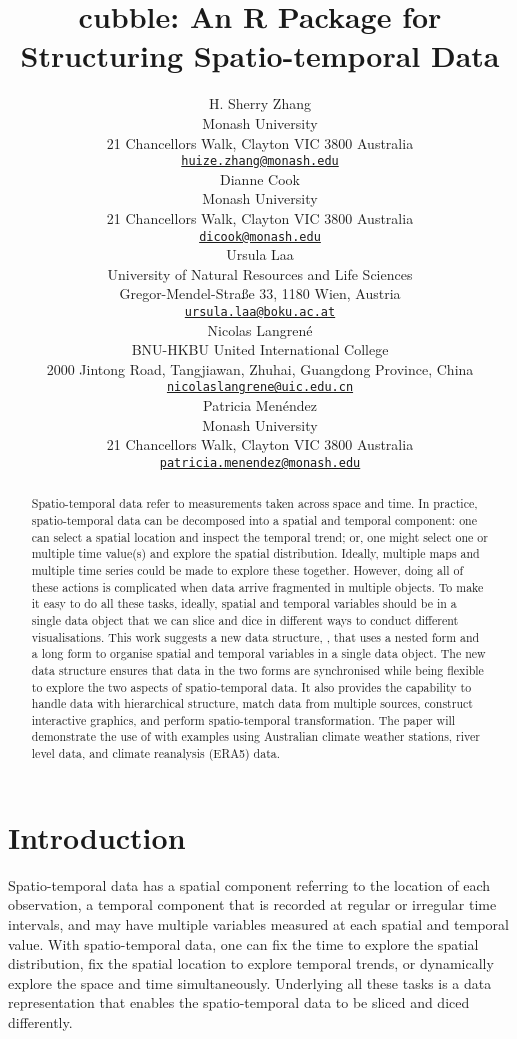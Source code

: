 \documentclass{article}
\title{cubble: An R Package for Structuring Spatio-temporal Data}
\author{
    H. Sherry Zhang
   \\
    Monash University \\
  21 Chancellors Walk, Clayton VIC 3800 Australia \\
  \texttt{\href{mailto:huize.zhang@monash.edu}{\nolinkurl{huize.zhang@monash.edu}}} \\
   \And
    Dianne Cook
   \\
    Monash University \\
  21 Chancellors Walk, Clayton VIC 3800 Australia \\
  \texttt{\href{mailto:dicook@monash.edu}{\nolinkurl{dicook@monash.edu}}} \\
   \And
    Ursula Laa
   \\
    University of Natural Resources and Life Sciences \\
  Gregor-Mendel-Straße 33, 1180 Wien, Austria \\
  \texttt{\href{mailto:ursula.laa@boku.ac.at}{\nolinkurl{ursula.laa@boku.ac.at}}} \\
   \And
    Nicolas Langrené
   \\
    BNU-HKBU United International College \\
  2000 Jintong Road, Tangjiawan, Zhuhai, Guangdong Province, China \\
  \texttt{\href{mailto:nicolaslangrene@uic.edu.cn}{\nolinkurl{nicolaslangrene@uic.edu.cn}}} \\
   \And
    Patricia Menéndez
   \\
    Monash University \\
  21 Chancellors Walk, Clayton VIC 3800 Australia \\
  \texttt{\href{mailto:patricia.menendez@monash.edu}{\nolinkurl{patricia.menendez@monash.edu}}} \\
  }
\begin{document}
\maketitle


\begin{abstract}
Spatio-temporal data refer to measurements taken across space and time. In practice, spatio-temporal data can be decomposed into a spatial and temporal component: one can select a spatial location and inspect the temporal trend; or, one might select one or multiple time value(s) and explore the spatial distribution. Ideally, multiple maps and multiple time series could be made to explore these together. However, doing all of these actions is complicated when data arrive fragmented in multiple objects. To make it easy to do all these tasks, ideally, spatial and temporal variables should be in a single data object that we can slice and dice in different ways to conduct different visualisations. This work suggests a new data structure, , that uses a nested form and a long form to organise spatial and temporal variables in a single data object. The new data structure ensures that data in the two forms are synchronised while being flexible to explore the two aspects of spatio-temporal data. It also provides the capability to handle data with hierarchical structure, match data from multiple sources, construct interactive graphics, and perform spatio-temporal transformation. The paper will demonstrate the use of  with examples using Australian climate weather stations, river level data, and climate reanalysis (ERA5) data.
\end{abstract}


\newpage

\hypertarget{introduction}{%
\section{Introduction}\label{introduction}}

Spatio-temporal data has a spatial component referring to the location of each observation, a temporal component that is recorded at regular or irregular time intervals, and may have multiple variables measured at each spatial and temporal value. With spatio-temporal data, one can fix the time to explore the spatial distribution, fix the spatial location to explore temporal trends, or dynamically explore the space and time simultaneously. Underlying all these tasks is a data representation that enables the spatio-temporal data to be sliced and diced differently.
\end{document}
